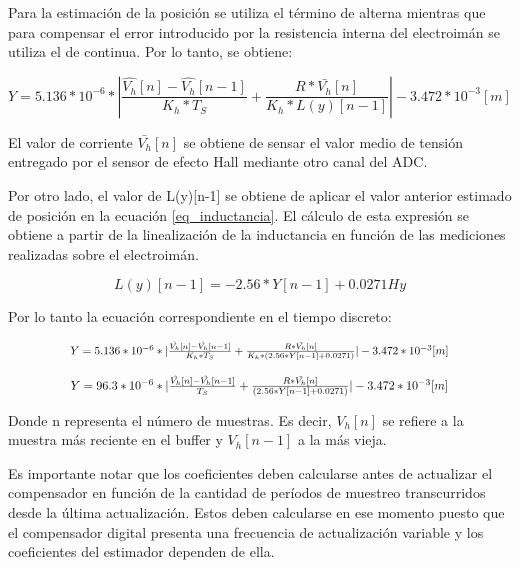 \noindent Para la estimación de la posición se utiliza el término de alterna mientras que para compensar el error introducido por la resistencia interna del electroimán se utiliza el de continua. Por lo tanto, se obtiene:

\begin{equation}
	Y = 5.136*10^{-6}*|\frac{\hat{V_h}[n]-\hat{V_h}[n-1]}{K_h*T_S} + \frac{R*\bar{V_h}[n]}{K_h*L(y)[n-1]}|-3.472*10^{-3}[m]
\end{equation}

\noindent El valor de corriente $\bar{V_h}[n]$ se obtiene de sensar el valor medio de tensión entregado por el sensor de efecto Hall mediante otro canal del ADC.

\noindent Por otro lado, el valor de L(y)[n-1] se obtiene de aplicar el valor anterior estimado de posición en la ecuación \ref{eq_inductancia}. El cálculo de esta expresión se obtiene a partir de la linealización de la inductancia en función de las mediciones realizadas sobre el electroimán.

\begin{equation} \label{eq_inductancia}
	L(y)[n-1] = -2.56*Y[n-1]+0.0271 Hy
\end{equation}

\noindent Por lo tanto la ecuación correspondiente en el tiempo discreto:

\begin{equation}
	\resizebox{.8\hsize}{!}
	{
	$Y = 5.136*10^{-6}*|\frac{\hat{V_h}[n]-\hat{V_h}[n-1]}{K_h*T_S} + \frac{R*\bar{V_h}[n]}{K_h*(2.56*Y[n-1]+0.0271)}|-3.472*10^{-3}[m]$
	}
\end{equation}

\begin{equation}
	\resizebox{.8\hsize}{!}
	{
	$
	Y = 96.3*10^{-6}*|\frac{\hat{V_h}[n]-\hat{V_h}[n-1]}{T_S} + \frac{R*\bar{V_h}[n]}{(2.56*Y[n-1]+0.0271)}|-3.472*10^{-3}[m]
	$
	}
\end{equation}


\noindent Donde n representa el número de muestras. Es decir, $V_h[n]$ se refiere a la muestra más reciente en el buffer y $V_h[n-1]$ a la más vieja.

\noindent Es importante notar que los coeficientes deben calcularse antes de actualizar el compensador en función de la cantidad de períodos de muestreo transcurridos desde la última actualización. Estos deben calcularse en ese momento puesto que el compensador digital presenta una frecuencia de actualización variable y los coeficientes del estimador dependen de ella.

